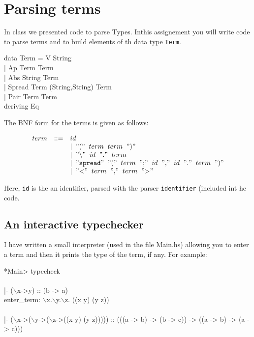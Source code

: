 \documentclass[11pt]{article}
\newcommand{\quot}[1]{"{\tt{{#1}}}"}
\newcommand{\mybs}{$\backslash$}
\begin{document}

\section{Parsing terms}

In class we presented code to parse Types.  Inthis assignement you
will write code to parse terms and to build elements of th data type
{\tt{Term}}.

\begin{program*}
\>  data Term = V String \\
\>            | Ap Term Term  \\
\>            | Abs String Term  \\
\>            | Spread Term (String,String) Term  \\
\>            | Pair Term Term \\
\>   deriving Eq \\
\end{program*}


The BNF form for the terms is given as follows:

\[\begin{array}{lcl}
term & ::=  & id \\
&& | \;\;  \quot{(} \;\; term \;\; term \;\; \quot{)} \\
&& | \;\;  \quot{\backslash} \;\; id \;\; \quot{.} \;\; term \\
&& | \;\;  \quot{spread} \;\; \quot{(} \;\; term \;\; \quot{;} \;\; id \;\; \quot{,} \;\; id \;\; \quot{.} \;\; term \;\; \quot{)} \\
&& | \;\;  \quot{<} \;\; term \;\; \quot{,} \;\; term \;\; \quot{>} \
\end{array}
\]

\noindent{}Here, {\tt{id}} is the an identifier, parsed with the parser {\tt{identifier}} (included int he code.


\subsection{An interactive typechecker}

I have written a small interpreter (used in the file Main.hs) allowing
you to enter a term and then it prints the type of the term, if any. For example:

\begin{program*}
\>*Main> typecheck \\
\> \\
\>[("y",a)] |- (\mybs{}x->y) :: (b -> a) \\
\>enter\_term: \mybs{}x.\mybs{}y.\mybs{}z. ((x y) (y z)) \\
\> \\
\>[] |- (\mybs{}x->(\mybs{}y->(\mybs{}z->((x y) (y z))))) :: (((a -> b) -> (b -> c)) -> ((a -> b) -> (a -> c))) \\
\end{program*}
\end{document}
